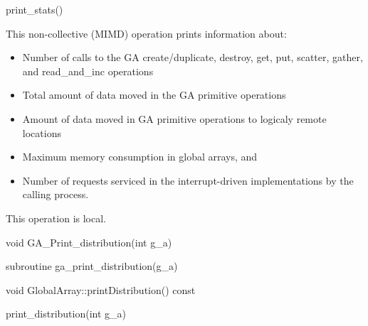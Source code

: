 \documentclass[12pt]{article}
\begin{document}
\begin{pyapi}
\begin{pycode}
print_stats()
\end{pycode}
\end{pyapi}
\local
\begin{desc}

This non-collective (MIMD) operation prints information about:
\begin{itemize}
    \item Number of calls to the GA create/duplicate, destroy, get,
     put, scatter, gather, and read_and_inc operations
    \item Total amount of data moved in the GA primitive operations
    \item Amount of data moved in GA primitive operations to logicaly
     remote locations
    \item Maximum memory consumption in global arrays, and
    \item Number of requests serviced in the interrupt-driven implementations
     by the calling process.
\end{itemize}

This operation is local.
\end{desc}


\begin{capi}
\begin{ccode}
void GA_Print_distribution(int g_a)
\end{ccode}
\begin{funcargs}
\end{funcargs}
\end{capi}

\begin{fapi}
\begin{fcode}
subroutine ga_print_distribution(g_a)
\end{fcode}
\begin{funcargs}
\end{funcargs}
\end{fapi}

\begin{cxxapi}
\begin{cxxcode}
void GlobalArray::printDistribution() const
\end{cxxcode}
\end{cxxapi}

\begin{pyapi}
\begin{pycode}
print_distribution(int g_a)
\end{pycode}
\end{pyapi}
\end{document}
